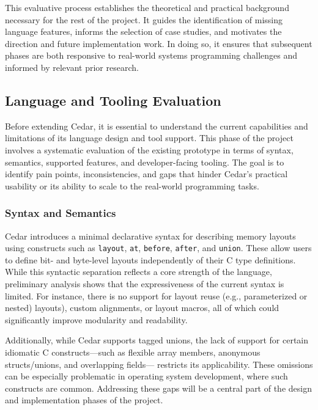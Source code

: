 \documentclass[12pt]{article}
\begin{document}
This evaluative process establishes the theoretical and practical background
necessary for the rest of the project. It guides the identification of missing
language features, informs the selection of case studies, and motivates the
direction and future implementation work. In doing so, it ensures that subsequent
phases are both responsive to real-world systems programming challenges and 
informed by relevant prior research.

\subsection{Language and Tooling Evaluation}
Before extending Cedar, it is essential to understand the current capabilities
and limitations of its language design and tool support. This phase of the
project involves a systematic evaluation of the existing prototype in terms of
syntax, semantics, supported features, and developer-facing tooling.
The goal is to identify pain points, inconsistencies, and gaps that hinder
Cedar's practical usability or its ability to scale to the real-world
programming tasks.

\subsubsection{Syntax and Semantics}
Cedar introduces a minimal declarative syntax for describing memory layouts
using constructs such as \texttt{layout}, \texttt{at}, \texttt{before},
\texttt{after}, and \texttt{union}. These allow users to define bit- and
byte-level layouts independently of their C type definitions. While this
syntactic separation reflects a core strength of the language, preliminary
analysis shows that the expressiveness of the current syntax is limited.
For instance, there is no support for layout reuse (e.g., parameterized or nested)
layouts), custom alignments, or layout macros, all of which could significantly
improve modularity and readability.

Additionally, while Cedar supports tagged unions, the lack of support for
certain idiomatic C constructs---such as flexible array members, anonymous
structs/unions, and overlapping fields--- restricts its applicability. These
omissions can be especially problematic in operating system development, where
such constructs are common. Addressing these gaps will be a central part of
the design and implementation phases of the project.
\end{document}
